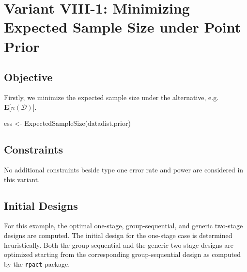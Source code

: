 \documentclass[
]{book}
\newenvironment{Shaded}{\begin{snugshade}}{\end{snugshade}}
\newcommand{\FunctionTok}[1]{\textcolor[rgb]{0.00,0.00,0.00}{#1}}
\newcommand{\NormalTok}[1]{#1}
\newcommand{\OtherTok}[1]{\textcolor[rgb]{0.56,0.35,0.01}{#1}}
\begin{document}
\hypertarget{variantVIII_1}{%
\section{Variant VIII-1: Minimizing Expected Sample Size under Point Prior}\label{variantVIII_1}}

\hypertarget{objective-20}{%
\subsection{Objective}\label{objective-20}}

Firstly, we minimize the expected sample size under the alternative, e.g.~\(\boldsymbol{E}\big[n(\mathcal{D})\big]\).

\begin{Shaded}
\begin{Highlighting}[]
\NormalTok{ess }\OtherTok{\textless{}{-}} \FunctionTok{ExpectedSampleSize}\NormalTok{(datadist,prior)}
\end{Highlighting}
\end{Shaded}

\hypertarget{constraints-20}{%
\subsection{Constraints}\label{constraints-20}}

No additional constraints beside type one error rate and power are considered in this variant.

\hypertarget{initial-designs-3}{%
\subsection{Initial Designs}\label{initial-designs-3}}

For this example, the optimal one-stage, group-sequential, and generic two-stage designs are computed. The initial design for the one-stage case is determined heuristically. Both the group sequential and the generic two-stage designs are optimized starting from the corresponding group-sequential design as computed by the \texttt{rpact} package.
\end{document}
